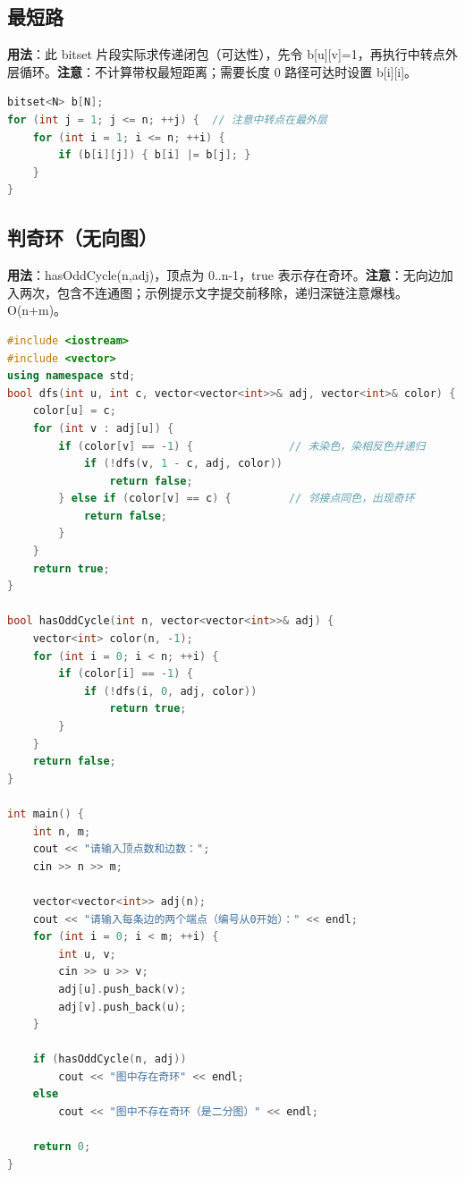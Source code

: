 \documentclass[a4paper,9pt]{extarticle}
\begin{document}
\subsection{最短路}

\textbf{用法}：此 bitset 片段实际求传递闭包（可达性），先令 b[u][v]=\allowbreak{}1，再执行中转点外层循环。\textbf{注意}：不计算带权最短距离；需要长度 0 路径可达时设置 b[i][i]。

\begin{lstlisting}[language={C++}]
bitset<N> b[N];
for (int j = 1; j <= n; ++j) {  // 注意中转点在最外层
    for (int i = 1; i <= n; ++i) {
        if (b[i][j]) { b[i] |= b[j]; }
    }
}
\end{lstlisting}
\subsection{判奇环（无向图）}

\textbf{用法}：hasOddCycle(\allowbreak{}n,\allowbreak{}adj)，顶点为 0..n-1，true 表示存在奇环。\textbf{注意}：无向边加入两次，包含不连通图；示例提示文字提交前移除，递归深链注意爆栈。O(\allowbreak{}n+\allowbreak{}m)。
\begin{lstlisting}[language={C++}]
#include <iostream>
#include <vector>
using namespace std;
bool dfs(int u, int c, vector<vector<int>>& adj, vector<int>& color) {
    color[u] = c;
    for (int v : adj[u]) {
        if (color[v] == -1) {               // 未染色，染相反色并递归
            if (!dfs(v, 1 - c, adj, color))
                return false;
        } else if (color[v] == c) {         // 邻接点同色，出现奇环
            return false;
        }
    }
    return true;
}

bool hasOddCycle(int n, vector<vector<int>>& adj) {
    vector<int> color(n, -1);
    for (int i = 0; i < n; ++i) {
        if (color[i] == -1) {
            if (!dfs(i, 0, adj, color))
                return true;   
        }
    }
    return false;
}

int main() {
    int n, m;
    cout << "请输入顶点数和边数：";
    cin >> n >> m;

    vector<vector<int>> adj(n);
    cout << "请输入每条边的两个端点（编号从0开始）：" << endl;
    for (int i = 0; i < m; ++i) {
        int u, v;
        cin >> u >> v;
        adj[u].push_back(v);
        adj[v].push_back(u);  
    }

    if (hasOddCycle(n, adj))
        cout << "图中存在奇环" << endl;
    else
        cout << "图中不存在奇环（是二分图）" << endl;

    return 0;
}
\end{lstlisting}
\end{document}
